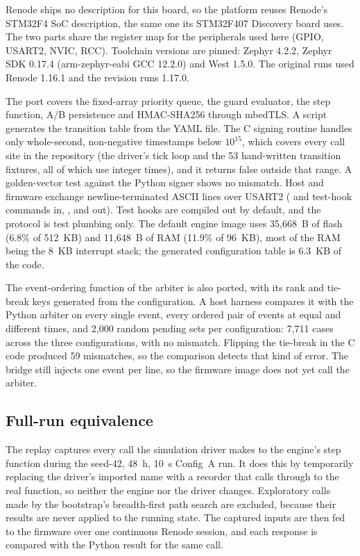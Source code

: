 \documentclass[preprint,12pt]{elsarticle}
\newcommand{\cfgA}{Config~A}
\begin{document}
Renode ships no description for this board, so the platform reuses Renode's STM32F4 SoC description, the same one its STM32F407 Discovery board uses. The two parts share the register map for the peripherals used here (GPIO, USART2, NVIC, RCC). Toolchain versions are pinned: Zephyr 4.2.2, Zephyr SDK 0.17.4 (arm-zephyr-eabi GCC 12.2.0) and West 1.5.0. The original runs used Renode 1.16.1 and the revision runs 1.17.0.

The port covers the fixed-array priority queue, the guard evaluator, the step function, A/B persistence and HMAC-SHA256 through mbedTLS. A script generates the transition table from the YAML file. The C signing routine handles only whole-second, non-negative timestamps below $10^{15}$, which covers every call site in the repository (the driver's tick loop and the 53 hand-written transition fixtures, all of which use integer times), and it returns false outside that range. A golden-vector test against the Python signer shows no mismatch. Host and firmware exchange newline-terminated ASCII lines over USART2 ( and test-hook commands in, ,  and  out). Test hooks are compiled out by default, and the protocol is test plumbing only. The default engine image uses 35,668~B of flash (6.8\% of 512~KB) and 11,648~B of RAM (11.9\% of 96~KB), most of the RAM being the 8~KB interrupt stack; the generated configuration table is 6.3~KB of the code.

The event-ordering function of the arbiter is also ported, with its rank and tie-break keys generated from the configuration. A host harness compares it with the Python arbiter on every single event, every ordered pair of events at equal and different times, and 2,000 random pending sets per configuration: 7,711 cases across the three configurations, with no mismatch. Flipping the  tie-break in the C code produced 59 mismatches, so the comparison detects that kind of error. The bridge still injects one event per line, so the firmware image does not yet call the arbiter.

\subsection{Full-run equivalence}

The replay captures every call the simulation driver makes to the engine's step function during the seed-42, 48~h, 10~s \cfgA{} run. It does this by temporarily replacing the driver's imported name with a recorder that calls through to the real function, so neither the engine nor the driver changes. Exploratory calls made by the bootstrap's breadth-first path search are excluded, because their results are never applied to the running state. The captured inputs are then fed to the firmware over one continuous Renode session, and each response is compared with the Python result for the same call.
\end{document}
